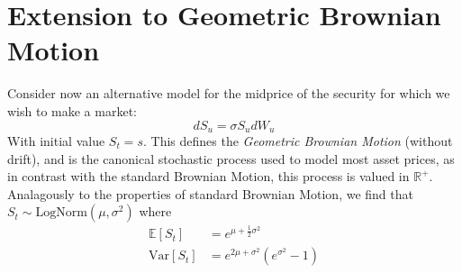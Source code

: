 \section{Extension to Geometric Brownian Motion}
Consider now an alternative model for the midprice of the security for 
which we wish to make a market:
$$dS_u=\sigma S_udW_u$$
With initial value $S_t=s.$ This defines the \textit{Geometric Brownian Motion} (without drift), and
is the canonical stochastic process used to model most asset prices, as in
contrast with the standard Brownian Motion, this process is valued in $\mathbb{R}^+.$
Analagously to the properties of standard Brownian Motion, we find that $S_t\sim\textrm{LogNorm}(\mu,\sigma^2)$
where
\begin{align*}
    \mathbb{E}[S_t]&=e^{\mu+\frac{1}{2}\sigma^2}\\
    \textrm{Var}[S_t]&=e^{2\mu+\sigma^2}(e^{\sigma^2}-1)
\end{align*}

